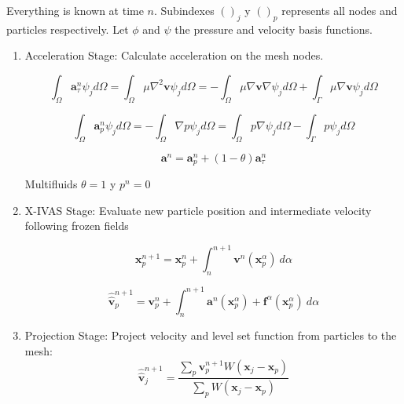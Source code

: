Everything is known at time $n$. Subindexes $()_j$ y $()_p$ represents all nodes and particles respectively. Let $\phi$ and $\psi$ the pressure and velocity basis functions.

\begin{enumerate}
  \item Acceleration Stage: Calculate acceleration on the mesh nodes.


  \begin{equation}\label{Step1a}
\int_{\Omega}\mathbf{a}^{n}_{\tau}\psi_j d\Omega=\int_{\Omega}\mu \nabla^{2}\mathbf{v} \psi_j d\Omega=-\int_{\Omega}\mu \nabla\mathbf{v} \nabla \psi_j d\Omega + \int_{\Gamma}\mu \nabla\mathbf{v} \psi_j d\Omega
\end{equation}

\begin{equation}\label{Step1b}
\int_{\Omega}\mathbf{a}^{n}_{p}\psi_j d\Omega=-\int_{\Omega}\nabla p \psi_j d\Omega=\int_{\Omega} p \nabla \psi_j d\Omega - \int_{\Gamma} p \psi_j d\Omega
\end{equation}

\begin{equation}\label{Step1c}
\mathbf{a}^{n}=\mathbf{a}^{n}_{p} + (1-\theta)\mathbf{a}^{n}_{\tau}
\end{equation}

Multifluids $\theta=1$ y $p^n=0$

  \item X-IVAS Stage: Evaluate new particle position and intermediate velocity following frozen fields

  \begin{equation}\label{Step2a}
\mathbf{x}^{n+1}_{p}=\mathbf{x}^{n}_{p} + \int_{n}^{n+1} \mathbf{v}^{n}(\mathbf{x}^{\alpha}_{p}) \ d\alpha
\end{equation}

\begin{equation}\label{Step2b}
\widehat{\widehat{\mathbf{v}}}^{n+1}_{p}=\mathbf{v}^{n}_{p} + \int_{n}^{n+1} \mathbf{a}^{n}(\mathbf{x}^{\alpha}_{p}) + \mathbf{f}^{\alpha} (\mathbf{x}^{\alpha}_{p})  \ d\alpha
\end{equation}

  \item Projection Stage: Project velocity and level set function from particles to the mesh:
  \begin{equation}\label{Step3a}
\displaystyle \widehat{\widehat{\mathbf{v}}}^{n+1}_{j}=\frac{\sum_{p} \mathbf{v}^{n+1}_{p} W(\mathbf{x}_{j}-\mathbf{x}_{p})}{\sum_{p} W(\mathbf{x}_{j}-\mathbf{x}_{p})}
\end{equation}


\end{enumerate}
